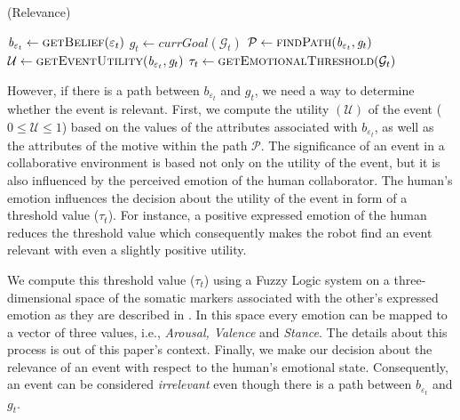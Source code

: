 \documentclass{aamas2016}
\begin{document}
\begin{algorithm}
	\caption{(Relevance)}
	\label{alg:relevance}
	\begin{algorithmic}[1]
			\Statex
			\State $\mathit{b}_{\varepsilon_t} \gets \Call{getBelief}{\varepsilon_t}$
			\State $\mathit{g}_{t} \gets \textit{currGoal}{(\mathcal{G}_{t})}$
			\Statex
			\State $\mathcal{P} \gets \Call{findPath}{\mathit{b}_{\varepsilon_t},
			\mathit{g}_{t}}$
			\Statex
				\State {}
			\Else
				\State $\mathcal{U} \gets \Call{getEventUtility}{\mathit{b}_{\varepsilon_t},
				\mathit{g}_{t}}$ 
				\State $\tau_{t} \gets \Call{getEmotionalThreshold}{\mathcal{G}_{t}}$
				\State {}
				\Else
					\State {}
				\EndIf
			\EndIf
		\EndFunction
	\end{algorithmic}
\end{algorithm}

However, if there is a path between $\mathit{b}_{\varepsilon_t}$ and $g_{t}$, we
need a way to determine whether the event is relevant. First, we compute the
utility $(\mathcal{U})$ of the event ($0 \leq \mathcal{U} \leq 1$)
based on the values of the attributes associated with
$\mathit{b}_{\varepsilon_t}$, as well as the attributes of the motive within the
path $\mathcal{P}$. The significance of an event in a collaborative environment
is based not only on the utility of the event, but it is also influenced by the
perceived emotion of the human collaborator. The human's emotion influences the
decision about the utility of the event in form of a threshold value
($\tau_{t}$). For instance, a positive expressed emotion of the human reduces
the threshold value which consequently makes the robot find an event relevant
with even a slightly positive utility.

We compute this threshold value ($\tau_{t}$) using a Fuzzy Logic system on a
three-dimensional space of the somatic markers associated with the other's
expressed emotion as they are described in \cite{breazeal:sociable-robot}. In
this space every emotion can be mapped to a vector of three values, i.e.,
\textit{Arousal, Valence} and \textit{Stance}. The details about this process is
out of this paper's context. Finally, we make our decision about the relevance
of an event with respect to the human's emotional state. Consequently, an event
can be considered \textit{irrelevant} even though there is a path between
$\mathit{b}_{\varepsilon_t}$ and $g_{t}$.
\end{document}
